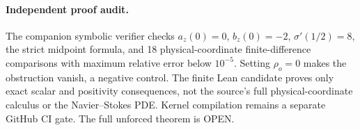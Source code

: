 \paragraph{Independent proof audit.}
The companion symbolic verifier checks $a_z(0)=0$,
$b_z(0)=-2$, $\sigma'(1/2)=8$, the strict midpoint formula,
and 18 physical-coordinate finite-difference comparisons with
maximum relative error below $10^{-5}$.
Setting $\rho_o=0$ makes the obstruction vanish, a negative control.
The finite Lean candidate proves only exact scalar and positivity
consequences, not the source's full physical-coordinate calculus
or the Navier--Stokes PDE. Kernel compilation remains a separate
GitHub CI gate. The full unforced theorem is OPEN.